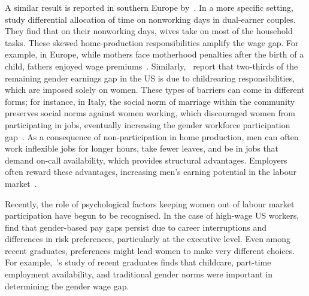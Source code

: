 A similar result is reported in southern Europe by~\citet{Lichard2021}. In a more specific setting,~\citet{Alvarez2019} study differential allocation of time on nonworking days in dual-earner couples. They find that on their nonworking days, wives take on most of the household tasks. These skewed home-production responsibilities amplify the wage gap. For example, in Europe, while mothers face motherhood penalties after the birth of a child, fathers enjoyed wage premiums~\citep{CukrowskaTorzewska2020}. Similarly,~\citet{Cortes2020} report that two-thirds of the remaining gender earnings gap in the US is due to childrearing responsibilities, which are imposed solely on women. These types of barriers can come in different forms; for instance, in Italy, the social norm of marriage within the community preserves social norms against women working, which discouraged women from participating in jobs, eventually increasing the gender workforce participation gap~\citep{Righetto2023}. As a consequence of non-participation in home production, men can often work inflexible jobs for longer hours, take fewer leaves, and be in jobs that demand on-call availability, which provides structural advantages. Employers often reward these advantages, increasing men’s earning potential in the labour market~\citep{Goldin2014}.\par

Recently, the role of psychological factors keeping women out of labour market participation have begun to be recognised. In the case of high-wage US workers,~\citet{Francis2023} find that gender-based pay gaps persist due to career interruptions and differences in risk preferences, particularly at the executive level. Even among recent graduates, preferences might lead women to make very different choices. For example,~\citet{Piazzalunga2018}'s study of recent graduates finds that childcare, part-time employment availability, and traditional gender norms were important in determining the gender wage gap.\par